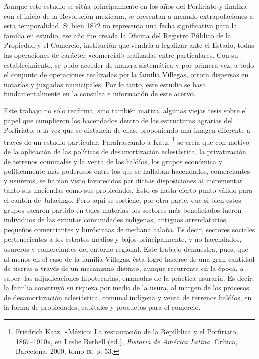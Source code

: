 \documentclass[14pt,twoside,final]{extbook} %
\let\oldfootnote\footnote
\renewcommand\footnote[1]{%
\oldfootnote{\hspace{1mm}#1}}
\begin{document}
Aunque este estudio se sitúa principalmente en los años del Porfiriato y finaliza con el inicio de la Revolución mexicana, se presentan a menudo extrapolaciones a esta temporalidad. Si bien 1872 no representa una fecha significativa para la familia en estudio, ese año fue creada la Oficina del Registro Público de la Propiedad y el Comercio, institución que vendría a legalizar ante el Estado, todas las operaciones de carácter «comercial» realizadas entre particulares. Con su establecimiento, se pudo acceder de manera sistemática y por primera vez, a todo el conjunto de operaciones realizadas por la familia Villegas, otrora dispersas en notarías y juzgados municipales. Por lo tanto, este estudio se basa fundamentalmente en la consulta e información de este acervo.\protect\enlargethispage*{\baselineskip}

Este trabajo no sólo reafirma, sino también matiza, algunas viejas tesis sobre el papel que cumplieron los hacendados dentro de las estructuras agrarias del Porfiriato; a la vez que se distancia de ellas, proponiendo una imagen diferente a través de un estudio particular. Parafraseando a Katz,\footnote{Friedrich Katz, «México: La restauración de la República y el Porfiriato, 1867--1910», en Leslie Bethell (ed.), \emph{Historia de América Latina.} Crítica, Barcelona, 2000, tomo \textsc{ix}, p. 53.} se creía que con motivo de la aplicación de las políticas de desamortización eclesiástica, la privatización de terrenos comunales y la venta de los baldíos, los grupos económica y políticamente más poderosos entre los que se hallaban hacendados, comerciantes y usureros, se habían visto favorecidos por dichas disposiciones al incrementar tanto sus haciendas como sus propiedades. Esto es hasta cierto punto válido para el cantón de Jalacingo. Pero aquí se sostiene, por otra parte, que si bien estos grupos sacaron partido en tales materias, los sectores más beneficiados fueron individuos de las extintas comunidades indígenas, antiguos arrendatarios, pequeños comerciantes y burócratas de mediana calaña. Es decir, sectores sociales pertenecientes a los estratos medios y bajos principalmente, y no hacendados, usureros y comerciantes del entorno regional. Este trabajo demuestra, pues, que al menos en el caso de la familia Villegas, ésta logró hacerse de una gran cantidad de tierras a través de un mecanismo distinto, aunque recurrente en la época, a saber: las adjudicaciones hipotecarias, emanadas de la práctica usuraria. Es decir, la familia construyó su riqueza por medio de la usura, al margen de los procesos de desamortización eclesiástica, comunal indígena y venta de terrenos baldíos, en la forma de propiedades, capitales y productos para el comercio.
\end{document}
